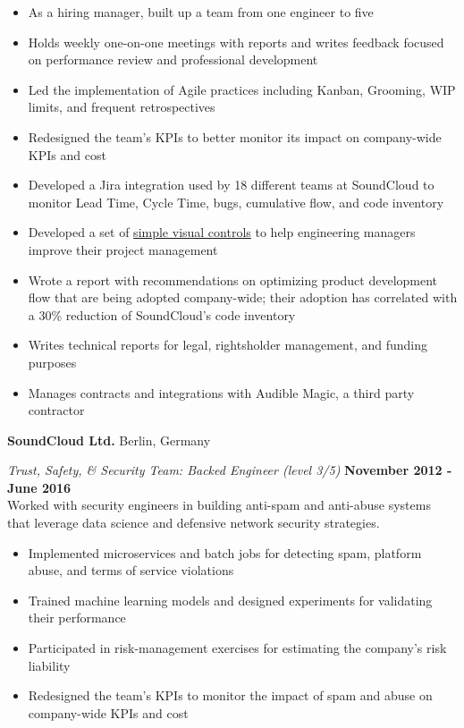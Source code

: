 \documentclass[margin,line]{res}
\newenvironment{list1}{
  \begin{list}{\ding{113}}{%
      \setlength{\itemsep}{0in}
      \setlength{\parsep}{0in} \setlength{\parskip}{0in}
      \setlength{\topsep}{0in} \setlength{\partopsep}{0in}
      \setlength{\leftmargin}{0.17in}}}{\end{list}}
\begin{document}
\begin{resume}
\begin{list1}
\begin{itemize}
\item As a hiring manager, built up a team from one engineer to five
\item Holds weekly one-on-one meetings with reports and writes feedback focused on performance review and professional development
\item Led the implementation of Agile practices including Kanban, Grooming, WIP limits, and frequent retrospectives
\item Redesigned the team's KPIs to better monitor its impact on company-wide KPIs and cost
\item Developed a Jira integration used by 18 different teams at SoundCloud to monitor Lead Time, Cycle Time, bugs, cumulative flow, and code inventory
\item Developed a set of \href{https://en.wikipedia.org/wiki/Visual_control}{simple visual controls} to help engineering managers improve their project management
\item Wrote a report with recommendations on optimizing product development flow that are being adopted company-wide; their adoption has correlated with a 30\% reduction of SoundCloud's code inventory
\item Writes technical reports for legal, rightsholder management, and funding purposes
\item Manages contracts and integrations with Audible Magic, a third party contractor
\end{itemize}

\end{list1}

{\bf SoundCloud Ltd.} Berlin, Germany\\
\vspace*{-.1in}
\begin{list1}
\item[] {\em Trust, Safety, \& Security Team: Backed Engineer (level 3/5)} \hfill {\bf November 2012 - June 2016}\\
Worked with security engineers in building anti-spam and anti-abuse systems that leverage data science and defensive network security strategies.

\begin{itemize}
\item Implemented microservices and batch jobs for detecting spam, platform abuse, and terms of service violations
\item Trained machine learning models and designed experiments for validating their performance
\item Participated in risk-management exercises for estimating the company's risk liability
\item Redesigned the team's KPIs to monitor the impact of spam and abuse on company-wide KPIs and cost
\end{itemize}


\end{list1}
\end{resume}
\end{document}
